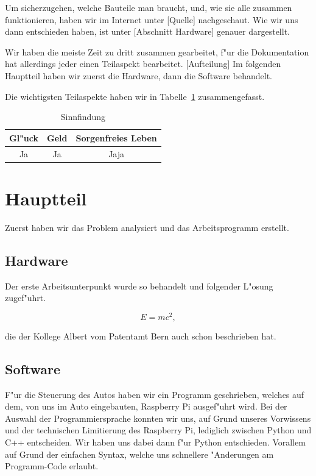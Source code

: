 \documentclass[a4paper,12pt]{article}
\begin{document}
Um sicherzugehen, welche Bauteile man braucht, und, wie sie alle zusammen funktionieren, haben wir im Internet unter [Quelle] nachgeschaut.
Wie wir uns dann entschieden haben, ist unter [Abschnitt Hardware] genauer dargestellt.

Wir haben die meiste Zeit zu dritt zusammen gearbeitet, f"ur die Dokumentation hat allerdings jeder einen Teilaspekt bearbeitet.
[Aufteilung]
Im folgenden Hauptteil haben wir zuerst die Hardware, dann die Software behandelt.

Die wichtigsten Teilaspekte haben wir in Tabelle~\ref{Tab1} zusammengefasst.

\begin{table}[h]
	\centering
	\begin{tabular}{|c|c|c|}
	\hline
		Gl"uck & Geld  & Sorgenfreies Leben  \\ \hline
		Ja  & Ja & Jaja \\ \hline
	\end{tabular}
	\caption{Sinnfindung}
	\label{Tab1}
\end{table}


\section{Hauptteil}\label{sec2}

Zuerst haben wir das Problem analysiert und das Arbeitsprogramm erstellt.

\subsection{Hardware}\label{sec2.1}

Der erste Arbeitsunterpunkt wurde so behandelt und folgender L"osung zugef"uhrt.

\begin{equation}
	E = mc^2 ,
\end{equation}

die der Kollege Albert vom Patentamt Bern  \cite{Alb05} auch schon beschrieben hat.

\subsection{Software}\label{sec2.2}

F"ur die Steuerung des Autos haben wir ein Programm geschrieben, welches auf dem, von uns im Auto eingebauten, Raspberry Pi ausgef"uhrt wird.
Bei der Auswahl der Programmiersprache konnten wir uns, auf Grund unseres Vorwissens und der technischen Limitierung des Raspberry Pi, lediglich zwischen Python und C++ entscheiden. Wir haben uns dabei dann f"ur Python entschieden.
Vorallem auf Grund der einfachen Syntax, welche uns schnellere "Anderungen am Programm-Code erlaubt.
\end{document}
